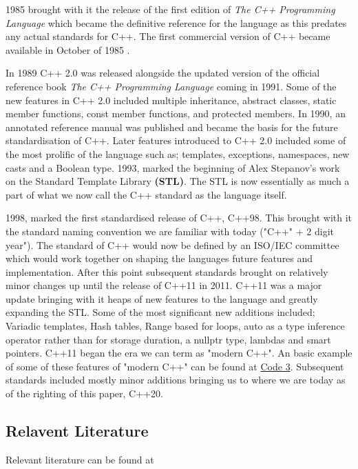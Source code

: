 \documentclass[conference, a4paper]{IEEEtran}
\begin{document}
1985 brought with it the release of the first edition of \textit{The C++ Programming Language} \cite{cpp_1985} which became the definitive reference for the language as this predates any actual standards for C++. The first commercial version of C++ became available in October of 1985 \cite{cppinvention}.

In 1989 C++ 2.0 was released alongside the updated version of the official reference book \textit{The C++ Programming Language} coming in 1991. Some of the new features in C++ 2.0 included multiple inheritance, abstract classes, static member functions, const member functions, and protected members. In 1990, an annotated reference manual was published and became the basis for the future standardisation of C++. Later features introduced to C++ 2.0 included some of the most prolific of the language such as; templates, exceptions, namespaces, new casts and a Boolean type. 1993, marked the beginning of Alex Stepanov's work on the Standard Template Library \textbf{(STL)}. The STL is now essentially as much a part of what we now call the C++ standard as the language itself. 

1998, marked the first standardised release of C++, C++98. This brought with it the standard naming convention we are familiar with today ("C++" + 2 digit year"). The standard of C++ would now be defined by an ISO/IEC committee which would work together on shaping the languages future features and implementation. After this point subsequent standards brought on relatively minor changes up until the release of C++11 in 2011. C++11 was a major update bringing with it heaps of new features to the language and greatly expanding the STL. Some of the most significant new additions included; Variadic templates, Hash tables, Range based for loops, auto as a type inference operator rather than for storage duration, a nullptr type, lambdas and smart pointers. C++11 began the era we can term as "modern C++". An basic example of some of these features of "modern C++" can be found at \hyperref[listing:3]{Code 3}. Subsequent standards included mostly minor additions bringing us to where we are today as of the righting of this paper, C++20.


\subsection{Relavent Literature}
Relevant literature can be found at \cite{cpphome,cpp_1985,cpphistory,cppoverview,cppevolving,josuttis2012c++,alexandrescu2001modern}
\end{document}
